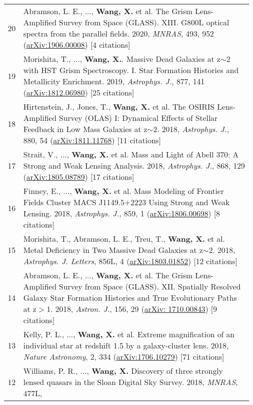 \documentclass[letterpaper,12pt]{article}
\begin{document}
\begin{longtable}{rp{5.8in}}
20  &   Abramson, L. E., ..., \textbf{Wang, X.} et al. The Grism Lens-Amplified Survey from Space (GLASS). XIII. G800L optical spectra from the 
    parallel fields. 2020, \textit{MNRAS}, 493, 952 (\href{https://arxiv.org/abs/1906.00008}{arXiv:1906.00008}) [4 citations]  \\
19  &   Morishita, T., ..., \textbf{Wang, X.}. Massive Dead Galaxies at z$\sim$2 with HST Grism Spectroscopy. I. Star Formation Histories and 
    Metallicity Enrichment. 2019, \textit{Astrophys. J.}, 877, 141 (\href{https://arxiv.org/abs/1812.06980}{arXiv:1812.06980}) [25 citations] \\
18  &   Hirtenstein, J., Jones, T., \textbf{Wang, X.} et al. The OSIRIS Lens-Amplified Survey (OLAS) I: Dynamical Effects of Stellar Feedback in Low 
    Mass Galaxies at z$\sim$2. 2018, \textit{Astrophys. J.}, 880, 54 (\href{https://arxiv.org/abs/1811.11768}{arXiv:1811.11768}) [11 citations] \\
17  &   Strait, V., ..., \textbf{Wang, X.} et al. Mass and Light of Abell 370: A Strong and Weak Lensing Analysis. 2018, \textit{Astrophys. J.}, 868, 
    129 (\href{https://arxiv.org/abs/1805.08789}{arXiv:1805.08789}) [17 citations] \\
16  &   Finney, E., ..., \textbf{Wang, X.} et al. Mass Modeling of Frontier Fields Cluster MACS J1149.5+2223 Using Strong and Weak Lensing. 2018, 
    \textit{Astrophys. J.}, 859, 1 (\href{https://arxiv.org/abs/1806.00698}{arXiv:1806.00698}) [8 citations] \\
15  &   Morishita, T., Abramson, L. E., Treu, T., \textbf{Wang, X.} et al.  Metal Deficiency in Two Massive Dead Galaxies at z$\sim$2. 2018, 
    \textit{Astrophys. J. Letters}, 856L, 4 (\href{https://arxiv.org/abs/1803.01852}{arXiv:1803.01852}) [12 citations]  \\
14  &   Abramson, L. E., ..., \textbf{Wang, X.} et al. The Grism Lens-Amplified Survey from Space (GLASS). XII. Spatially Resolved Galaxy Star 
    Formation Histories and True Evolutionary Paths at z$>$1. 2018, \textit{Astron. J.}, 156, 29 (\href{https://arxiv.org/abs/1710.00843}{arXiv:
    1710.00843}) [9 citations]  \\
13  &   Kelly, P. L., ..., \textbf{Wang, X.} et al. Extreme magnification of an individual star at redshift 1.5 by a galaxy-cluster lens. 2018, 
    \textit{Nature Astronomy}, 2, 334 (\href{https://arxiv.org/abs/1706.10279}{arXiv:1706.10279}) [71 citations]  \\
12  &   Williams, P. R., ..., \textbf{Wang, X.} Discovery of three strongly lensed quasars in the Sloan Digital Sky Survey. 2018, \textit{MNRAS}, 477L, 

\end{longtable}
\end{document}
